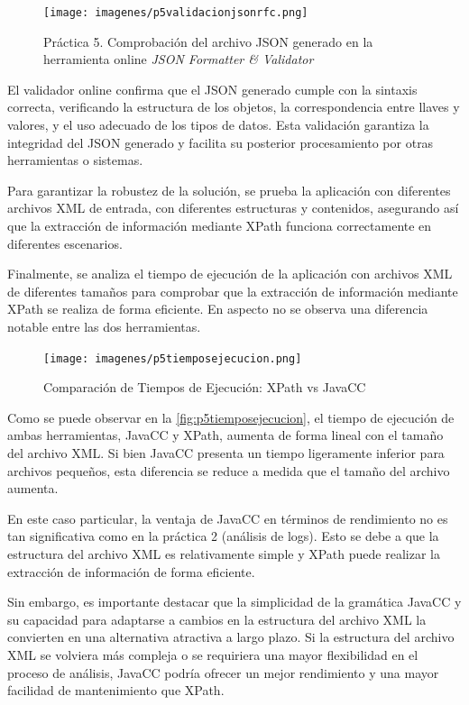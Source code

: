 \begin{figure}[H]
	\centering
	\texttt{[image: imagenes/p5validacionjsonrfc.png]}
	\caption{\label{fig:p5validacionjsonrfc}Práctica 5. Comprobación del archivo JSON generado en la herramienta online \textit{JSON Formatter \& Validator} }
\end{figure}

El validador online confirma que el JSON generado cumple con la sintaxis correcta, verificando la estructura de los objetos, la correspondencia entre llaves y valores, y el uso adecuado de los tipos de datos. Esta validación garantiza la integridad del JSON generado y facilita su posterior procesamiento por otras herramientas o sistemas.

Para garantizar la robustez de la solución, se prueba la aplicación con diferentes archivos XML de entrada, con diferentes estructuras y contenidos, asegurando así que la extracción de información mediante XPath funciona correctamente en diferentes escenarios.

Finalmente, se analiza el tiempo de ejecución de la aplicación con archivos XML de diferentes tamaños para comprobar que la extracción de información mediante XPath se realiza de forma eficiente. En aspecto no se observa una diferencia notable entre las dos herramientas.

\begin{figure}[H]
	\centering
	\texttt{[image: imagenes/p5tiemposejecucion.png]}
	\caption{\label{fig:p5tiemposejecucion}Comparación de Tiempos de Ejecución: XPath vs JavaCC}
\end{figure}


Como se puede observar en la \autoref{fig:p5tiemposejecucion}, el tiempo de ejecución de ambas herramientas, JavaCC y XPath, aumenta de forma lineal con el tamaño del archivo XML. Si bien JavaCC presenta un tiempo ligeramente inferior para archivos pequeños, esta diferencia se reduce a medida que el tamaño del archivo aumenta.

En este caso particular, la ventaja de JavaCC en términos de rendimiento no es tan significativa como en la práctica 2 (análisis de logs). Esto se debe a que la estructura del archivo XML es relativamente simple y XPath puede realizar la extracción de información de forma eficiente.

Sin embargo, es importante destacar que la simplicidad de la gramática JavaCC y su capacidad para adaptarse a cambios en la estructura del archivo XML la convierten en una alternativa atractiva a largo plazo. Si la estructura del archivo XML se volviera más compleja o se requiriera una mayor flexibilidad en el proceso de análisis, JavaCC podría ofrecer un mejor rendimiento y una mayor facilidad de mantenimiento que XPath.

